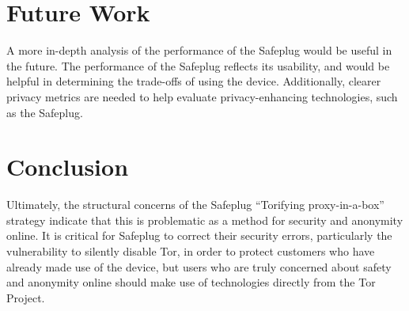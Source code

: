 \documentclass[letterpaper,twocolumn,10pt]{article}
\begin{document}
\section{Future Work}
A more in-depth analysis of the performance of the Safeplug would be useful in the future.  The performance of the Safeplug reflects its usability, and would be helpful in determining the trade-offs of using the device.  Additionally, clearer privacy metrics are needed to help evaluate privacy-enhancing technologies, such as the Safeplug.  

\section{Conclusion}
Ultimately, the structural concerns of the Safeplug ``Torifying proxy-in-a-box'' strategy indicate that this is problematic as a method for security and anonymity online.  It is critical for Safeplug to correct their security errors, particularly the vulnerability to silently disable Tor, in order to protect customers who have already made use of the device, but users who are truly concerned about safety and anonymity online should make use of technologies directly from the Tor Project.

{\footnotesize 
}

\end{document}
